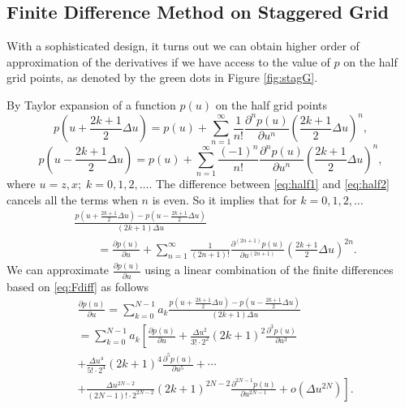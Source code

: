 \documentclass[11pt]{article}
\theoremstyle{plain}
\theoremstyle{definition}
\theoremstyle{remark}
\numberwithin{equation}{section}
\begin{document}
\subsection{Finite Difference Method on Staggered Grid}
With a sophisticated design, it turns out we can obtain higher order of approximation of the derivatives if we have access to the value of $p$ on the half grid points, as denoted by the green dots in Figure \ref{fig:stagG}. 

By Taylor expansion of a function $p(u)$ on the half grid points
  \begin{equation}\label{eq:half1}
      p\left(u + \frac{2k+1}{2}\Delta u\right) = p(u) + \sum\limits_{n=1}^{\infty} \frac{1}{n!}     \frac{\partial^n p(u)}{\partial u^n}\left(\frac{2k+1}{2}\Delta u\right)^n, 
      \end{equation}
      \begin{equation}\label{eq:half2}
      p\left(u - \frac{2k+1}{2}\Delta u\right) = p(u) + \sum\limits_{n=1}^{\infty} \frac{(-1)^n}{n!}\frac{\partial^n p(u)}{\partial u^n}\left(\frac{2k+1}{2}\Delta u\right)^n,
  \end{equation}
where $u = z, x; \; k = 0, 1, 2, \dots $.
  The difference between \eqref{eq:half1} and \eqref{eq:half2} cancels all the terms when $n$ is even.
So it implies that for $k = 0, 1, 2, \dots$
\begin{equation}
\label{eq:Fdiff}
    \begin{aligned}
   &  \frac{p\left(u + \frac{2k+1}{2}\Delta u\right) - p\left(u - \frac{2k+1}{2}\Delta u\right)}{(2k+1)\Delta u}\\
    &~~~~~~~~~  =  \frac{\partial p(u)}{\partial u} + \sum\limits_{n=1 }^{\infty} \frac{1}{(2n+1)!}\frac{\partial^{(2n+1)} p(u)}{\partial u^{(2n+1)}}\left(\frac{2k+1}{2}\Delta u\right)^{2n}.
    \end{aligned}
    \end{equation}
We can approximate $\frac{\partial p(u)}{\partial u}$ using a linear combination of the finite differences based on \eqref{eq:Fdiff} as follows
  \begin{equation}
  \label{eq:weight}
  \begin{aligned}
    &\frac{\partial p(u)}{\partial u} = \sum\limits_{k=0}^{N-1} a_k \frac{p\left(u + \frac{2k+1}{2}\Delta u\right) - p\left(u - \frac{2k+1}{2}\Delta u\right)}{(2k+1)\Delta u} \\
    &= \sum\limits_{k=0}^{N-1} a_k \left[ \frac{\partial p(u)}{\partial u} + \frac{\Delta u^2}{3! \cdot 2^2}(2k+1)^2\frac{\partial^3 p(u)}{\partial u^3} \right.\\&\left. + \frac{\Delta u^4}{5! \cdot 2^4}(2k+1)^4\frac{\partial^5 p(u)}{\partial u^5} + \cdots \right.\\&\left. + \frac{\Delta u^{2N-2}}{(2N-1)! \cdot 2^{2N-2}}(2k+1)^{2N-2}\frac{\partial^{2N-1} p(u)}{\partial u^{2N-1}} + o(\Delta u^{2N}) \right].
  \end{aligned}
  \end{equation}
\end{document}
